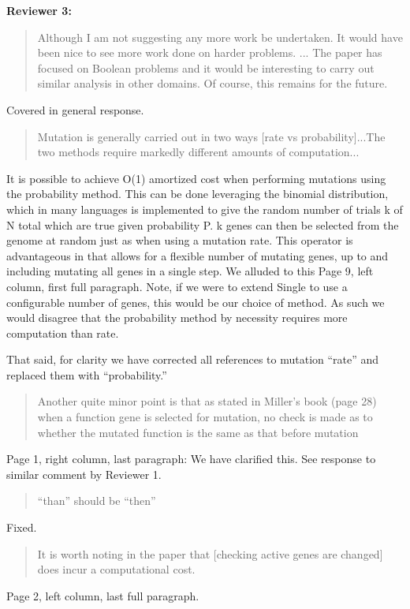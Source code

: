 \documentclass{letter}
\begin{document}
\begin{letter}{}
\textbf{Reviewer 3:}

\begin{quote}Although I am not suggesting any more work be undertaken. It would have been nice
to see more work done on harder problems. ... The paper has focused on Boolean problems and it would be interesting to
carry out similar analysis in other domains. Of course, this remains for the future.\end{quote}
Covered in general response.

\begin{quote}Mutation is generally carried out in two ways [rate vs probability]...The two methods require markedly
different amounts of computation...\end{quote}
It is possible to achieve O(1) amortized cost when performing mutations using the probability method.
This can be done leveraging the binomial distribution, which in many languages is implemented to give
the random number of trials k of N total which are true given probability P.  k genes can then
be selected from the genome at random just as when using a mutation rate.  This operator is
advantageous in that allows for a flexible number of mutating genes, up to and including
mutating all genes in a single step.  We alluded to this Page 9, left column, first full paragraph.
Note, if we were to extend Single to use a configurable
number of genes, this would be our choice of method.  As such we would disagree that the probability method
by necessity requires more computation than rate.

That said, for clarity we have corrected all references to mutation ``rate'' and replaced them with ``probability.''

\begin{quote}Another quite minor point is that as stated in Miller's book (page 28) when a function gene is selected for mutation, no
check is made as to whether the mutated function is the same as that before mutation\end{quote}
Page 1, right column, last paragraph: We have clarified this.  See response to similar comment by Reviewer 1.

\begin{quote}``than'' should be ``then''\end{quote}
Fixed.

\begin{quote}It is worth noting in the paper that [checking active genes are changed] does incur a computational cost.\end{quote}
Page 2, left column, last full paragraph.


\end{letter}
\end{document}
